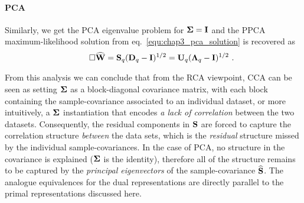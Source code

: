       \paragraph{PCA}
      Similarly, we get the PCA eigenvalue problem for $\mathbf{\Sigma} = \mathbf{I}$ and the PPCA maximum-likelihood solution from eq.~\eqref{equ:chap3_pca_solution} is recovered as
      \begin{equation*}
	\tag*{$\square$}
	\widehat{\mathbf{W}} = \mathbf{S}_q (\mathbf{D}_q - \mathbf{I})^{1/2} = \mathbf{U}_q (\mathbf{\Lambda}_q - \mathbf{I})^{1/2} ~.
      \end{equation*}

      From this analysis we can conclude that from the RCA viewpoint, CCA can be seen as setting $\mathbf{\Sigma}$ as a block-diagonal covariance matrix, with each block containing the sample-covariance associated to an individual dataset, or more intuitively, a $\mathbf{\Sigma}$ instantiation that encodes \emph{a lack of correlation} between the two datasets. Consequently, the residual components in $\mathbf{S}$ are forced to capture the correlation structure \emph{between} the data sets, which is the \emph{residual} structure missed by the individual sample-covariances. In the case of PCA, no structure in the covariance is explained ($\mathbf{\Sigma}$ is the identity), therefore all of the structure remains to be captured by the \emph{principal eigenvectors} of the sample-covariance $\widehat{\mathbf{S}}$. The analogue equivalences for the dual representations are directly parallel to the primal representations discussed here.

